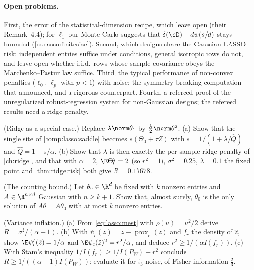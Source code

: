 \begin{refsection}
\paragraph{Open problems.} First, the error of the statistical-dimension recipe, which \textcite{AmelunxenEtAl2014} leave open (their Remark~4.4); for $\ell_1$ our Monte Carlo suggests that $\delta(\cD)-d\psi(s/d)$ stays bounded (\cref{ex:lasso:finitesize}). Second, which designs share the Gaussian LASSO risk: independent entries suffice under conditions, general isotropic rows do not, and \textcite{HanShen2023} leave open whether i.i.d.\ rows whose sample covariance obeys the Marchenko--Pastur law suffice. Third, the typical performance of non-convex penalties ($\ell_0$, $\ell_p$ with $p<1$) with noise: the symmetry-breaking computation that \textcite{KabashimaEtAl2009} announced, and a rigorous counterpart. Fourth, a refereed proof of the unregularized robust-regression system for non-Gaussian designs; the refereed results need a ridge penalty.

\begin{exercises}
\item \consolidation (Ridge as a special case.) Replace $\lambda\norm\theta_1$ by $\frac\lambda2\norm\theta^2$. (a) Show that the single site of \cref{comp:lasso:saddle} becomes $s(\Theta_0+\tau Z)$ with $s=1/(1+\lambda/\hat Q)$ and $\hat Q=1-s/\alpha$. (b) Show that $\lambda$ is then exactly the per-sample ridge penalty of \cref{ch:ridge}, and that with $\alpha=2$, $\E\Theta_0^2=2$ (so $r^2=1$), $\sigma^2=0.25$, $\lambda=0.1$ the fixed point and \cref{thm:ridge:risk} both give $R=0.17678$.\label{ex:lasso:ridge}

\item \consolidation (The counting bound.) Let $\theta_0\in\R^d$ be fixed with $k$ nonzero entries and $A\in\R^{n\times d}$ Gaussian with $n\ge k+1$. Show that, almost surely, $\theta_0$ is the only solution of $A\theta=A\theta_0$ with at most $k$ nonzero entries. \label{ex:lasso:lzero}

\item \consolidation\hard (Variance inflation.) (a) From \eqref{eq:lasso:mest} with $\rho(u)=u^2/2$ derive $R=\sigma^2/(\alpha-1)$. (b) With $\psi_c(z)=z-\operatorname{prox}_c(z)$ and $f_r$ the density of $\hat z$, show $\E\psi_c'(\hat z)=1/\alpha$ and $\E\psi_c(\hat z)^2=r^2/\alpha$, and deduce $r^2\ge1/(\alpha I(f_r))$. (c) With Stam's inequality $1/I(f_r)\ge1/I(P_W)+r^2$ \parencite{Stam1959} conclude $R\ge1/((\alpha-1)I(P_W))$; evaluate it for $t_3$ noise, of Fisher information $\frac23$. \label{ex:lasso:fisher}


\end{exercises}
\end{refsection}
